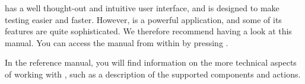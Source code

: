\GD has a well thought-out and intuitive user interface, and is designed to make testing easier and faster. However,  \GD is a powerful application, and some of its features are quite sophisticated. We therefore recommend having a look at this manual. You can access the manual from within \gd{} by pressing .  

In the reference manual, you will find information on the more technical aspects of working with \gd{}, such as a description of the supported components and actions. 



